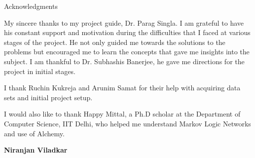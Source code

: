 \begin{center}
\LARGE{Acknowledgments} 
\end{center}

\vspace{0.5in}

My sincere thanks to my project guide, Dr. Parag Singla.
I am grateful to have his constant support and motivation
during the difficulties that I faced at various stages of the project. 
He not only guided me towards the solutions to the problems but encouraged 
me to learn the concepts that gave me insights into the subject. I am thankful 
to Dr. Subhashis Banerjee, he gave me directions for the project in initial stages.

I thank Ruchin Kukreja and Arunim Samat 
for their help with acquiring data sets and initial project setup.

I would also like to thank Happy Mittal, a Ph.D scholar at the Department of Computer Science, IIT Delhi, 
who helped me understand Markov Logic Networks and use of Alchemy.
\vspace{1.5in}

{\bfseries Niranjan Viladkar}
